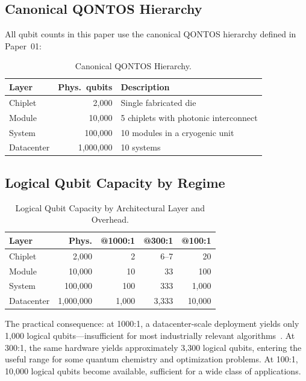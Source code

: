 \documentclass[conference]{IEEEtran}
\begin{document}
\subsection{Canonical QONTOS Hierarchy}

All qubit counts in this paper use the canonical QONTOS hierarchy defined in Paper~01:

\begin{table}[htbp]
\centering
\caption{Canonical QONTOS Hierarchy.}
\label{tab:hierarchy}
\begin{tabular}{lrl}
\toprule
\textbf{Layer} & \textbf{Phys.\ qubits} & \textbf{Description} \\
\midrule
Chiplet & 2,000 & Single fabricated die \\
Module & 10,000 & 5 chiplets with photonic interconnect \\
System & 100,000 & 10 modules in a cryogenic unit \\
Datacenter & 1,000,000 & 10 systems \\
\bottomrule
\end{tabular}
\end{table}

\subsection{Logical Qubit Capacity by Regime}

\begin{table}[htbp]
\centering
\caption{Logical Qubit Capacity by Architectural Layer and Overhead.}
\label{tab:logical_capacity}
\begin{tabular}{lrrrr}
\toprule
\textbf{Layer} & \textbf{Phys.} & \textbf{@1000:1} & \textbf{@300:1} & \textbf{@100:1} \\
\midrule
Chiplet & 2,000 & 2 & 6--7 & 20 \\
Module & 10,000 & 10 & 33 & 100 \\
System & 100,000 & 100 & 333 & 1,000 \\
Datacenter & 1,000,000 & 1,000 & 3,333 & 10,000 \\
\bottomrule
\end{tabular}
\end{table}

The practical consequence: at 1000:1, a datacenter-scale deployment yields only 1,000 logical qubits---insufficient for most industrially relevant algorithms~\cite{beverland2022}. At 300:1, the same hardware yields approximately 3,300 logical qubits, entering the useful range for some quantum chemistry and optimization problems. At 100:1, 10,000 logical qubits become available, sufficient for a wide class of applications.
\end{document}
